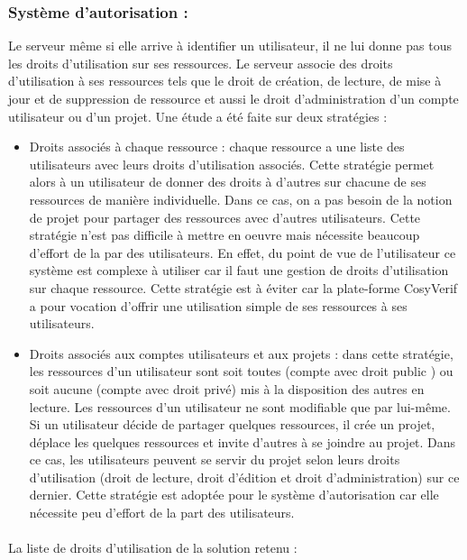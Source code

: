 \documentclass{report}
\begin{document}
\subsubsection{Système d'autorisation :}
Le serveur même si elle arrive à identifier un utilisateur, il ne lui donne pas tous les droits d'utilisation sur ses ressources.
Le serveur associe des droits d'utilisation à ses ressources tels que le droit de création, de lecture, de mise à jour et de 
suppression de ressource et aussi le droit d'administration d'un compte utilisateur ou d'un projet. Une étude a été faite
sur deux stratégies :
\begin{itemize}
\item Droits associés à chaque ressource : chaque ressource a une liste des utilisateurs avec leurs droits d'utilisation associés. Cette stratégie permet alors à un utilisateur de donner des droits à d'autres sur chacune de ses ressources
de manière individuelle. Dans ce cas, on a pas besoin de la notion de projet pour partager des ressources avec d'autres
utilisateurs. Cette stratégie n'est pas difficile à mettre en oeuvre mais nécessite beaucoup d'effort de la par 
des utilisateurs. En effet, du point de vue de l'utilisateur ce système est complexe à utiliser car il faut une gestion
de droits d'utilisation sur chaque ressource. Cette stratégie est à éviter car la plate-forme CosyVerif a pour vocation 
d'offrir une utilisation simple de ses ressources à ses utilisateurs.
\item Droits associés aux comptes utilisateurs et aux projets : dans cette stratégie, les ressources d'un utilisateur sont
soit toutes (compte avec droit public ) ou soit aucune (compte avec droit privé) mis à la disposition des autres en lecture. Les ressources d'un utilisateur ne sont modifiable que par lui-même. Si un utilisateur décide de partager quelques ressources, il crée un projet, déplace les quelques ressources et invite d'autres à se joindre au projet. Dans ce cas, les utilisateurs peuvent se servir du projet selon leurs droits d'utilisation (droit de lecture, droit d'édition et droit d'administration) sur ce dernier. Cette stratégie est adoptée pour le système d'autorisation car elle nécessite peu
d'effort de la part des utilisateurs.
\end{itemize} 

\paragraph{}
La liste de droits d'utilisation de la solution retenu :
\end{document}
